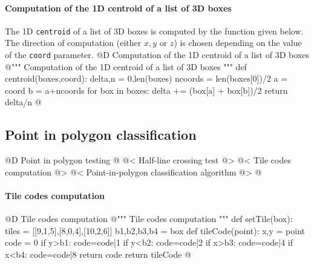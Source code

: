 \documentclass[11pt,oneside]{article}    %
\begin{document}
\paragraph{Computation of the 1D centroid of a list of 3D boxes}
The 1D \texttt{centroid} of a list of 3D boxes is computed by the function given below.
The direction of computation (either $x,y$ or $z$) is chosen depending on the value of the \texttt{coord} parameter. 
@D Computation of the 1D centroid of a list of 3D boxes
@{""" Computation of the 1D centroid of a list of 3D boxes """    
def centroid(boxes,coord):
    delta,n = 0,len(boxes)
    ncoords = len(boxes[0])/2
    a = coord%
    b = a+ncoords
    for box in boxes:
        delta += (box[a] + box[b])/2
    return delta/n
@}

\subsection{Point in polygon classification}

@D Point in polygon testing
@{
@< Half-line crossing test @>
@< Tile codes computation @>
@< Point-in-polygon classification algorithm @>
@}

\paragraph{Tile codes computation}
@D Tile codes computation
@{""" Tile codes computation """
def setTile(box):
    tiles = [[9,1,5],[8,0,4],[10,2,6]]
    b1,b2,b3,b4 = box
    def tileCode(point):
        x,y = point
        code = 0
        if y>b1: code=code|1
        if y<b2: code=code|2
        if x>b3: code=code|4
        if x<b4: code=code|8
        return code 
    return tileCode
@}
\end{document}
